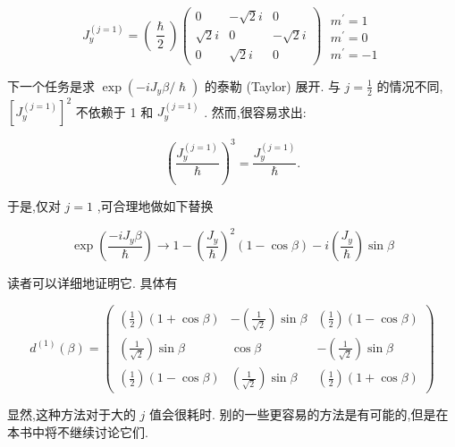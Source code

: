 $$
{J}_{y}^{\left( j = 1\right) } = \left( \frac{\hslash }{2}\right) \left( \begin{matrix} 0 & - \sqrt{2}i & 0 \\ \sqrt{2}i & 0 & - \sqrt{2}i \\ 0 & \sqrt{2}i & 0 \end{matrix}\right) \;\begin{array}{l} {m}^{\prime } = 1 \\ {m}^{\prime } = 0 \\ {m}^{\prime } = - 1 \end{array} 
$$

下一个任务是求 $\exp \left( {-i{J}_{y}\beta /\hslash }\right)$ 的泰勒 (Taylor) 展开. 与 $j = \frac{1}{2}$ 的情况不同, ${\left\lbrack {J}_{y}^{\left( j = 1\right) }\right\rbrack }^{2}$ 不依赖于 1 和 ${J}_{y}^{\left( j = 1\right) }$ . 然而,很容易求出:

$$
{\left( \frac{{J}_{y}^{\left( j = 1\right) }}{\hslash }\right) }^{3} = \frac{{J}_{y}^{\left( j = 1\right) }}{\hslash }. 
$$

于是,仅对 $j = 1$ ,可合理地做如下替换

$$
\exp \left( \frac{-i{J}_{y}\beta }{\hslash }\right) \rightarrow 1 - {\left( \frac{{J}_{y}}{\hslash }\right) }^{2}\left( {1 - \cos \beta }\right) - i\left( \frac{{J}_{y}}{\hslash }\right) \sin \beta 
$$

读者可以详细地证明它. 具体有

$$
{d}^{\left( 1\right) }\left( \beta \right) = \left( \begin{matrix} \left( \frac{1}{2}\right) \left( {1 + \cos \beta }\right) & - \left( \frac{1}{\sqrt{2}}\right) \sin \beta & \left( \frac{1}{2}\right) \left( {1 - \cos \beta }\right) \\ \left( \frac{1}{\sqrt{2}}\right) \sin \beta & \cos \beta & - \left( \frac{1}{\sqrt{2}}\right) \sin \beta \\ \left( \frac{1}{2}\right) \left( {1 - \cos \beta }\right) & \left( \frac{1}{\sqrt{2}}\right) \sin \beta & \left( \frac{1}{2}\right) \left( {1 + \cos \beta }\right) \end{matrix}\right)
$$

显然,这种方法对于大的 $j$ 值会很耗时. 别的一些更容易的方法是有可能的,但是在本书中将不继续讨论它们.

\ifx\allfiles\undefined

	\else
	\fi
